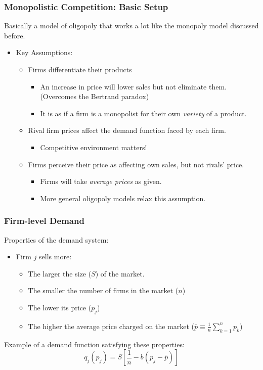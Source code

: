 \documentclass{beamer}
\begin{document}
\begin{frame}
	\frametitle{Monopolistic Competition: Basic Setup}
	
Basically a model of oligopoly that works a lot like the monopoly model discussed before.
\begin{itemize}
	\item Key Assumptions:
		\begin{itemize}
			\item Firms differentiate their products 
				\begin{itemize}
					\item An increase in price will lower sales but not eliminate them. (Overcomes the Bertrand paradox)
					\item It is as if a firm is a monopolist for their own \emph{variety} of a product.
				\end{itemize}
			\item Rival firm prices affect the demand function faced by each firm.
				\begin{itemize}
					\item Competitive environment matters!
				\end{itemize} 
			\item Firms perceive their price as affecting own sales, but not rivals' price.
					\begin{itemize}
						\item Firms will take \emph{average prices} as given.
						\item More general oligopoly models relax this assumption.
					\end{itemize}
		\end{itemize}				
\end{itemize}



\end{frame}
\begin{frame}
\frametitle{Firm-level Demand}
Properties of the demand system:
\begin{itemize}
\item Firm $j$ sells more:
	\begin{itemize}
		\item The larger the size ($S$) of the market.
		\item The smaller the number of firms in the market ($n$)
		\item The lower its price ($p_j$)
		\item The higher the average price charged on the market ($\bar{p}\equiv\frac{1}{n}\sum^n_{k=1}p_k$)
	\end{itemize}
\end{itemize}
Example of a demand function satisfying these properties:
\[ q_j(p_j) = S \left[ \frac{1}{n} - b \left( p_j - \bar{p} \right) \right] \]


\end{frame}
\end{document}
